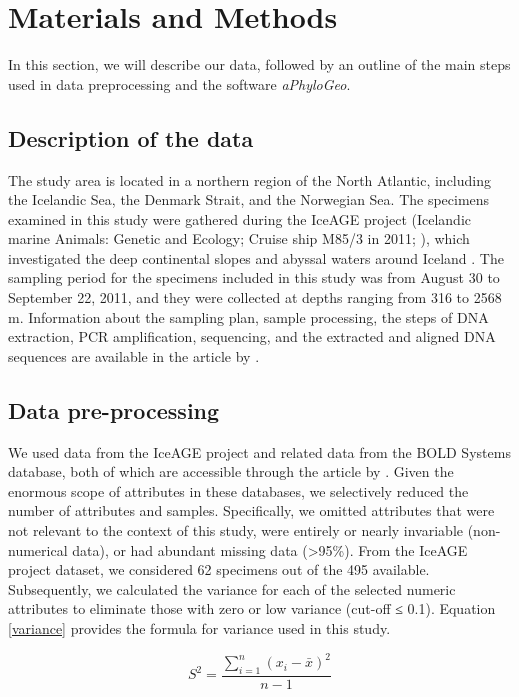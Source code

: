 \section{Materials and Methods}\label{materials-methods}
In this section, we will describe our data, followed by an outline of the main steps used in data preprocessing and the software \textit{aPhyloGeo}. 

\subsection{Description of the data}
The study area is located in a northern region of the North Atlantic, including the Icelandic Sea, the Denmark Strait, and the Norwegian Sea. The specimens examined in this study were gathered during the IceAGE project (Icelandic marine Animals: Genetic and Ecology; Cruise ship M85/3 in 2011; \cite{brix_iceage_2014}), which investigated the deep continental slopes and abyssal waters around Iceland \citep{meisner_prefacebiodiversity_2018}. The sampling period for the specimens included in this study was from August 30 to September 22, 2011, and they were collected at depths ranging from 316 to 2568 m.  Information about the sampling plan, sample processing, the steps of DNA extraction, PCR amplification, sequencing, and the extracted and aligned DNA sequences are available in the article by \citep{uhlir_adding_2021}.

\subsection{Data pre-processing}
We used data from the IceAGE project and related data from the BOLD Systems database, both of which are accessible through the article by \citep{uhlir_adding_2021}. Given the enormous scope of attributes in these databases, we selectively reduced the number of attributes and samples. Specifically, we omitted attributes that were not relevant to the context of this study, were entirely or nearly invariable (non-numerical data), or had abundant missing data (>95\%). From the IceAGE project dataset, we considered 62 specimens out of the 495 available. Subsequently, we calculated the variance for each of the selected numeric attributes to eliminate those with zero or low variance (cut-off ≤ 0.1). Equation \ref{variance} provides the formula for variance used in this study.

\begin{equation}\label{variance}
    S^2 = \frac{\sum_{i=1}^{n} (x_i - \bar{x})^2}{n-1}
\end{equation}

